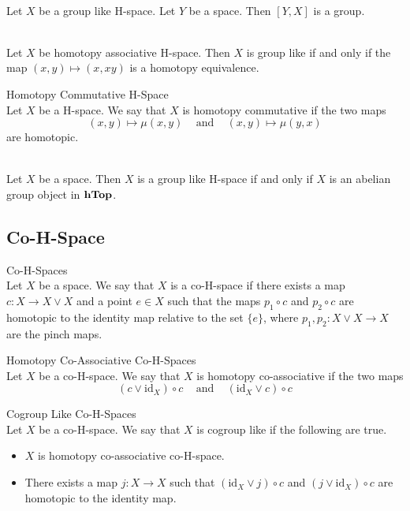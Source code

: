 \documentclass[a4paper]{article}
\begin{document}
\begin{lmm}{}{}\\
Let $X$ be a group like H-space. Let $Y$ be a space. Then $[Y,X]$ is a group. 
\end{lmm}

\begin{prp}{}{}\\
Let $X$ be homotopy associative H-space. Then $X$ is group like if and only if the map $(x,y)\mapsto(x,xy)$ is a homotopy equivalence. 
\end{prp}

\begin{defn}{Homotopy Commutative H-Space}{}\\
Let $X$ be a H-space. We say that $X$ is homotopy commutative if the two maps $$(x,y)\mapsto\mu(x,y)\;\;\;\text{ and }\;\;\;(x,y)\mapsto\mu(y,x)$$ are homotopic. 
\end{defn}

\begin{lmm}{}{}\\
Let $X$ be a space. Then $X$ is a group like H-space if and only if $X$ is an abelian group object in $\bold{hTop}$. 
\end{lmm}

\subsection{Co-H-Space}
\begin{defn}{Co-H-Spaces}{}\\
Let $X$ be a space. We say that $X$ is a co-H-space if there exists a map $c:X\to X\vee X$ and a point $e\in X$ such that the maps $p_1\circ c$ and $p_2\circ c$ are homotopic to the identity map relative to the set $\{e\}$, where $p_1,p_2:X\vee X\to X$ are the pinch maps. 
\end{defn}

\begin{defn}{Homotopy Co-Associative Co-H-Spaces}{}\\
Let $X$ be a co-H-space. We say that $X$ is homotopy co-associative if the two maps $$(c\vee\text{id}_X)\circ c\;\;\;\text{ and }\;\;\;(\text{id}_X\vee c)\circ c$$
\end{defn}

\begin{defn}{Cogroup Like Co-H-Spaces}{}\\
Let $X$ be a co-H-space. We say that $X$ is cogroup like if the following are true. 
\begin{itemize}
\item $X$ is homotopy co-associative co-H-space. 
\item There exists a map $j:X\to X$ such that $(\text{id}_X\vee j)\circ c$ and $(j\vee\text{id}_X)\circ c$ are homotopic to the identity map. 
\end{itemize}
\end{defn}
\end{document}

